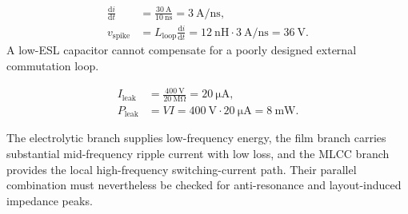 
\begin{solutionblock}
    \begin{align}
        \frac{\mathrm{d}i}{\mathrm{d}t}
        &=\frac{\SI{30}{\ampere}}{\SI{10}{\nano\second}}
        =\SI{3}{\ampere\per\nano\second},\\
        v_\mathrm{spike}
        &=L_\mathrm{loop}\frac{\mathrm{d}i}{\mathrm{d}t}
        =\SI{12}{\nano\henry}\cdot\SI{3}{\ampere\per\nano\second}
        =\SI{36}{\volt}.
    \end{align}
    A low-ESL capacitor cannot compensate for a poorly designed external
    commutation loop.
\end{solutionblock}


\begin{solutionblock}
    \begin{align}
        I_\mathrm{leak}&=\frac{\SI{400}{\volt}}{\SI{20}{\mega\ohm}}
        =\SI{20}{\micro\ampere},\\
        P_\mathrm{leak}&=VI=\SI{400}{\volt}\cdot\SI{20}{\micro\ampere}
        =\SI{8}{\milli\watt}.
    \end{align}
\end{solutionblock}


\begin{solutionblock}
    The electrolytic branch supplies low-frequency energy, the film branch
    carries substantial mid-frequency ripple current with low loss, and the
    MLCC branch provides the local high-frequency switching-current path.
    Their parallel combination must nevertheless be checked for anti-resonance
    and layout-induced impedance peaks.
\end{solutionblock}






